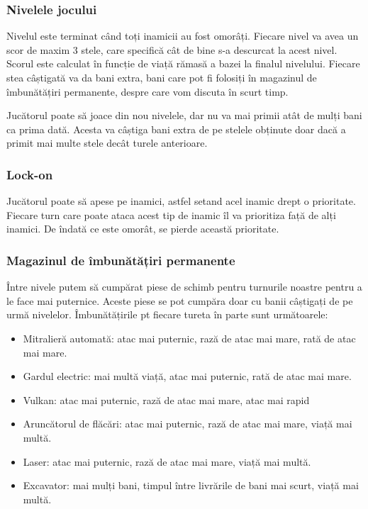 \documentclass[12pt, a4paper]{article}
\begin{document}
	
	
	
	
	\subsubsection{Nivelele jocului}
	
	Nivelul este terminat când toți inamicii au fost omorâți. Fiecare nivel va avea un scor de maxim 3 stele, care specifică cât de bine s-a descurcat la acest nivel. Scorul este calculat în funcție de viață rămasă a bazei la finalul nivelului. Fiecare stea câștigată va da bani extra, bani care pot fi folosiți în magazinul de îmbunătățiri permanente, despre care vom discuta în scurt timp.
	\newline
	
	Jucătorul poate să joace din nou nivelele, dar nu va mai primii atât de mulți bani ca prima dată. Acesta va câștiga bani extra de pe stelele obținute doar dacă a primit mai multe stele decât turele anterioare.
	
	
	
	
	
	\subsubsection{Lock-on}
	
	Jucătorul poate să apese pe inamici, astfel setand acel inamic drept o prioritate. Fiecare turn care poate ataca acest tip de inamic îl va prioritiza față de alți inamici. De îndată ce este omorât, se pierde această prioritate.
	
	
	
	
	
	\subsubsection{Magazinul de îmbunătățiri permanente}
	
	Între nivele putem să cumpărat piese de schimb pentru turnurile noastre pentru a le face mai puternice. Aceste piese se pot cumpăra doar cu banii câștigați de pe urmă nivelelor. Îmbunătățirile pt fiecare tureta în parte sunt următoarele:
	
	\begin{itemize}
		\item Mitralieră automată: atac mai puternic, rază de atac mai mare, rată de atac mai mare.
		\item Gardul electric: mai multă viață, atac mai puternic, rată de atac mai mare.
		\item Vulkan: atac mai puternic, rază de atac mai mare, atac mai rapid
		\item Aruncătorul de flăcări: atac mai puternic, rază de atac mai mare, viață mai multă.
		\item Laser: atac mai puternic, rază de atac mai mare, viață mai multă.
		\item Excavator: mai mulți bani, timpul între livrările de bani mai scurt, viață mai multă.
	\end{itemize}
	
\end{document}
